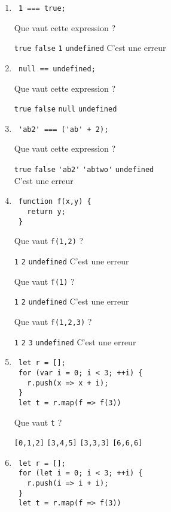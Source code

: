 \documentclass[a4paper, 12pt]{article}
\newcommand{\choice}[1]{\Square\hspace{2pt} #1\hspace{5pt}}
\newcommand{\choicec}[1]{\Square\hspace{2pt} \lstinline{#1}\hspace{5pt}}
\begin{document}
\begin{enumerate}
\item \lstset{language=javascript}
\begin{lstlisting}
 1 === true;
\end{lstlisting}

  Que vaut cette expression ?

  \choicec{true} \choicec{false} \choicec{1} \choicec{undefined} \choice{C'est une erreur}
\item \lstset{language=javascript}
\begin{lstlisting}
 null == undefined;
\end{lstlisting}

  Que vaut cette expression ?

  \choicec{true} \choicec{false} \choicec{null} \choicec{undefined}
\item \lstset{language=javascript}
\begin{lstlisting}
 'ab2' === ('ab' + 2);
\end{lstlisting}

  Que vaut cette expression ?

  \choicec{true} \choicec{false} \choicec{'ab2'} \choicec{'abtwo'}
  \choicec{undefined}\\\choice{C'est une erreur}
\item \begin{lstlisting}
 function f(x,y) {
   return y;
 }
\end{lstlisting}

  Que vaut \lstinline{f(1,2)} ?

  \choicec{1} \choicec{2} \choicec{undefined} \choice{C'est une erreur}

  Que vaut \lstinline{f(1)} ?

  \choicec{1} \choicec{2} \choicec{undefined} \choice{C'est une erreur}

  Que vaut \lstinline{f(1,2,3)} ?

  \choicec{1} \choicec{2} \choicec{3} \choicec{undefined} \choice{C'est une erreur}
\item \lstset{language=javascript}
\begin{lstlisting}
 let r = [];
 for (var i = 0; i < 3; ++i) {
   r.push(x => x + i);
 }
 let t = r.map(f => f(3))
\end{lstlisting}

  Que vaut \lstinline{t} ?

  \choicec{[0,1,2]} \choicec{[3,4,5]} \choicec{[3,3,3]} \choicec{[6,6,6]}

\newpage
\item \lstset{language=javascript}
\begin{lstlisting}
 let r = [];
 for (let i = 0; i < 3; ++i) {
   r.push(i => i + i);
 }
 let t = r.map(f => f(3))
\end{lstlisting}


\end{enumerate}
\end{document}
